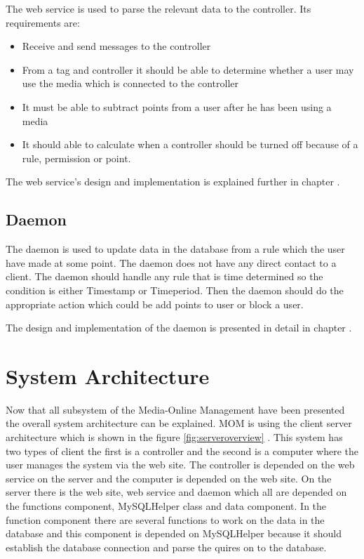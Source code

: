 The web service is used to parse the relevant data to the controller. Its requirements are:

\begin{itemize}
	\item Receive and send messages to the controller
	\item From a tag and controller it should be able to determine whether a user may use the media which is connected to the controller
	\item It must be able to subtract points from a user after he has been using a media
	\item It should able to calculate when a controller should be turned off because of a rule, permission or point.
\end{itemize}

The web service's design and implementation is explained further in chapter .


\subsection{Daemon}
The daemon is used to update data in the database from a rule which the user have made at some point. The daemon does not have any direct contact to a client. The daemon should handle any rule that is time determined so the condition is either Timestamp or Timeperiod. Then the daemon should do the appropriate action which could be add points to user or block a user.

The design and implementation of the daemon is presented in detail in chapter . 
 
\section{System Architecture}
\label{sec:sysArchitecture}
Now that all subsystem of the Media-Online Management have been presented the overall system architecture can be explained. MOM is using the client server architecture which is shown in the figure \ref{fig:serveroverview} \citep{OOAD}. This system has two types of client the first is a controller and the second is a computer where the user manages the system via the web site. The controller is depended on the web service on the server and the computer is depended on the web site. On the server there is the web site, web service and daemon which all are depended on the functions component, MySQLHelper class and data component. In the function component there are several functions to work on the data in the database and this component is depended on MySQLHelper because it should establish the database connection and parse the quires on to the database. 

